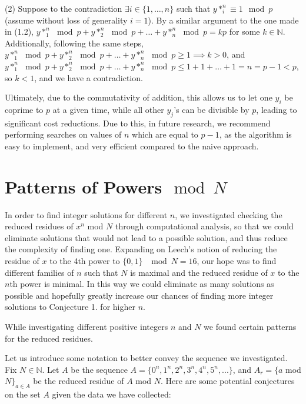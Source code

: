 \documentclass{article}
\begin{document}
\begin{flushleft}
\vspace{.1in}

(2) Suppose to the contradiction $\exists i \in \{1, \ldots, n\}$ such that $y*_i^n \equiv 1 \mod p$ (assume without loss of generality $i = 1$). By a similar argument to the one made in (1.2), $y*_1^n \mod p + y*_2^n \mod p + \ldots + y*_n^n \mod p = kp$ for some $k \in \mathbb{N}$. Additionally, following the same steps, $y*_1^n \mod p + y*_2^n \mod p + \ldots + y*_n^n \mod p \geq 1 \implies k > 0$, and $y*_1^n \mod p + y*_2^n \mod p + \ldots + y*_n^n \mod p \leq 1 + 1 + \ldots + 1 = n = p - 1 < p$, so $k < 1$, and we have a contradiction.

Ultimately, due to the commutativity of addition, this allows us to let one $y_i$ be coprime to $p$ at a given time, while all other $y_j$'s can be divisible by $p$, leading to significant cost reductions. Due to this, in future research, we recommend performing searches on values of $n$ which are equal to $p - 1$, as the algorithm is easy to implement, and very efficient compared to the naive approach.

\section{Patterns of Powers$\mod N$}
In order to find integer solutions for different $n$, we investigated checking the reduced residues of $x^n$ mod $N$ through computational analysis, so that we could eliminate solutions that would not lead to a possible solution, and thus reduce the complexity of finding one. Expanding on Leech's \cite{leech} notion of reducing the residue of $x$ to the 4th power to $\{0,1\}$ $\mod N=16$, our hope was to find different families of $n$ such that $N$ is maximal and the reduced residue of $x$ to the $n$th power is minimal. In this way we could eliminate as many solutions as possible and hopefully greatly increase our chances of finding more integer solutions to Conjecture 1. for higher $n$. 

\vspace{.1in}

While investigating different positive integers $n$ and $N$ we found certain patterns for the reduced residues. 

\vspace{.1in}

Let us introduce some notation to better convey the sequence we investigated. Fix $N\in\mathbb{N}$. Let $A$ be the sequence $A = \{0^n,1^n,2^n,3^n,4^n,5^n,...\}$, and $A_r = \{a$ mod $N\}_{a\in A}$ be the reduced residue of $A$ mod $N$. Here are some potential conjectures on the set $A$ given the data we have collected:


\end{flushleft}
\end{document}
